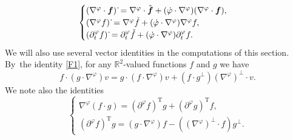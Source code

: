 \documentclass[10pt]{amsart}
\newcommand{\R}{{\mathbb R}}
\newcommand{\dt}{\partial_t}
\theoremstyle{definition}
\begin{document}
\begin{equation}\label{linearization 2}
\begin{cases}
(\nabla^\varphi \cdot \mbox{\boldmath$f$})\,\dot{}
= \nabla^\varphi \cdot \check{\mbox{\boldmath$f$}}
+ (\dot{\varphi} \cdot \nabla^\varphi)(\nabla^\varphi \cdot \mbox{\boldmath$f$}), \\
(\nabla^\varphi f)\,\dot{}
= \nabla^\varphi \check{f} + (\dot{\varphi} \cdot \nabla^\varphi)\nabla^\varphi f, \\
(\dt^\varphi f)\,\dot{}
= \dt^\varphi\check{f} + (\dot{\varphi} \cdot \nabla^\varphi)\dt^\varphi f.
\end{cases}
\end{equation}
We will also use several vector identities in the computations of this section. By~the identity \eqref{F1}, for any $\R^2$-valued functions $f$ and $g$ we have
\begin{equation}\label{F2}
f\cdot(g\cdot\nabla^\varphi)v = g\cdot(f\cdot\nabla^\varphi)v+(f\cdot g^\perp)(\nabla^\varphi)^\perp\cdot v.
\end{equation}
We note also the identities
\begin{equation}\label{F3}
\begin{cases}
\nabla^\varphi(f\cdot g) = (\partial^\varphi f)^\mathrm{T}g + (\partial^\varphi g)^\mathrm{T}f, \\
(\partial^\varphi f)^\mathrm{T}g = (g\cdot\nabla^\varphi)f - ((\nabla^\varphi)^\perp\cdot f)g^\perp.
\end{cases}
\end{equation}
\end{document}
